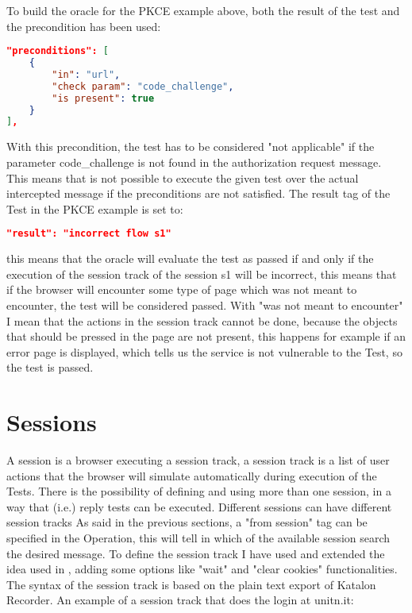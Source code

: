 To build the oracle for the PKCE example above, both the result of the test and the precondition has been used:
\begin{lstlisting}[language=json, caption=Precondition definition]
"preconditions": [
    {
        "in": "url",
        "check param": "code_challenge",
        "is present": true
    }
],
\end{lstlisting}
With this precondition, the test has to be considered "not applicable" if the parameter code\_challenge is not found in the authorization request message. This means that is not possible to execute the given test over the actual intercepted message if the preconditions are not satisfied.
The result tag of the Test in the PKCE example is set to:
\begin{lstlisting}[language=json]
"result": "incorrect flow s1"
\end{lstlisting}
this means that the oracle will evaluate the test as passed if and only if the execution of the \gls{session track} of the session s1 will be incorrect, this means that if the browser will encounter some type of page which was not meant to encounter, the test will be considered passed. With "was not meant to encounter" I mean that the actions in the \gls{session track} cannot be done, because the objects that should be pressed in the page are not present, this happens for example if an error page is displayed, which tells us the service is not vulnerable to the Test, so the test is passed.

\section{Sessions}
A session is a browser executing a \gls{session track}, a \gls{session track} is a list of user actions that the browser will simulate automatically during execution of the Tests. There is the possibility of defining and using more than one session, in a way that (i.e.) reply tests can be executed. Different sessions can have different session tracks
As said in the previous sections, a "from session" tag can be specified in the Operation, this will tell in which of the available session search the desired message. To define the \gls{session track} I have used and extended the idea used in \cite{giulio_pellizzari,claudio_grisenti,stefano_facchini}, adding some options like "wait" and "clear cookies" functionalities.
The syntax of the \gls{session track} is based on the plain text export of Katalon Recorder\cite{katalon_recorder_syntax}.
An example of a \gls{session track} that does the login at unitn.it:

